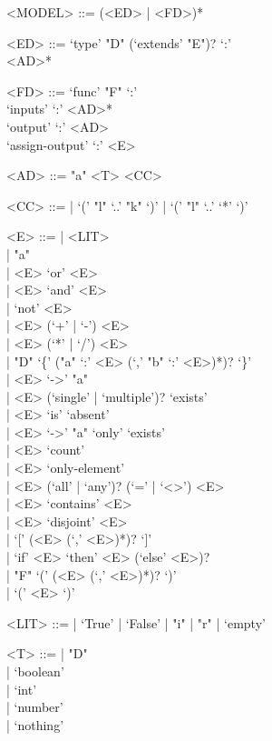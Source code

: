 \begin{grammar}
<MODEL> ::= 
  (<ED> | <FD>)*

<ED> ::= 
  `type' "D" (`extends' "E")? `:'\\
\ind <AD>*

<FD> ::= 
  `func' "F" `:'\\
\ind `inputs' `:' <AD>*\\
\ind `output' `:' <AD>\\
\ind `assign-output' `:' <E>

<AD> ::= 
  "a" <T> <CC>

<CC> ::= 
  | `(' "l" `..' "k" `)' 
  | `(' "l" `..' `*' `)' 

<E> ::= 
  | <LIT>\\
  | "a"\\
  | <E> `or' <E>\\
  | <E> `and' <E>\\
  | `not' <E>\\
  | <E> (`+' | `-') <E>\\
  | <E> (`*' | `/') <E>\\
  | "D" `\{' ("a" `:' <E> (`,' "b" `:' <E>)*)? `\}'\\
  | <E> `->' "a"\\
  | <E> (`single' | `multiple')? `exists'\\
  | <E> `is' `absent'\\
  | <E> `->' "a" `only' `exists'\\
  | <E> `count'\\
  | <E> `only-element'\\
  | <E> (`all' | `any')? (`=' | `<>') <E>\\
  | <E> `contains' <E>\\
  | <E> `disjoint' <E>\\
  | `[' (<E> (`,' <E>)*)? `]'\\
  | `if' <E> `then' <E> (`else' <E>)?\\
  | "F" `(' (<E> (`,' <E>)*)? `)'\\
  | `(' <E> `)'

<LIT> ::= 
  | `True' | `False' 
  | "i" 
  | "r" 
  | `empty' 

<T> ::= 
  | "D"\\
  | `boolean'\\
  | `int'\\
  | `number'\\
  | `nothing'
\end{grammar}
